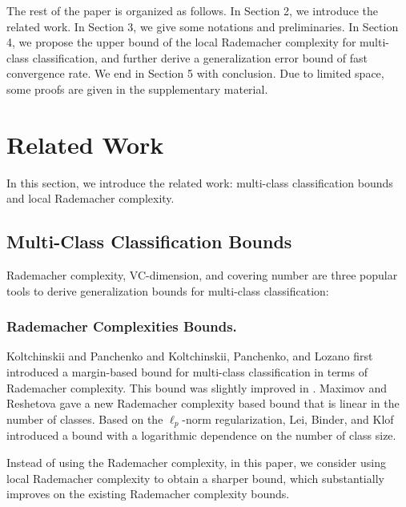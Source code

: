 \documentclass{article}
\begin{document}
The rest of the paper is organized as follows.
In Section 2, we introduce the related work.
In Section 3, we give
some notations and preliminaries.
In Section 4,
we propose the upper bound of the local Rademacher complexity for multi-class classification,
and further derive a generalization error bound of fast convergence rate.
We end in Section 5 with conclusion.
Due to limited space,
some proofs are given in the supplementary material.

\section{Related Work}
In this section,
we  introduce  the related work:
multi-class classification bounds and  local Rademacher complexity.
\subsection{Multi-Class Classification Bounds}
 Rademacher complexity, VC-dimension, and covering number are  three
 popular tools to derive generalization bounds for multi-class classification:
\subsubsection{Rademacher Complexities Bounds.}
   Koltchinskii and Panchenko 
    and Koltchinskii, Panchenko, and Lozano 
    first introduced a margin-based bound for multi-class classification in terms of Rademacher complexity.
    This bound was slightly improved in \cite{mohri2012foundations,cortes2013multi}.
    Maximov and Reshetova \cite{maximov2016tight} gave a new Rademacher complexity based bound
    that is linear in the number of classes.
    Based on the $\ell_p$-norm regularization,
    Lei, Binder, and Klof  introduced a bound
    with a logarithmic dependence on the number of class size.

    Instead of using the Rademacher complexity,
    in this paper, we consider using local Rademacher complexity
    to obtain a sharper bound, which  substantially improves on
    the existing Rademacher complexity bounds.
\end{document}
